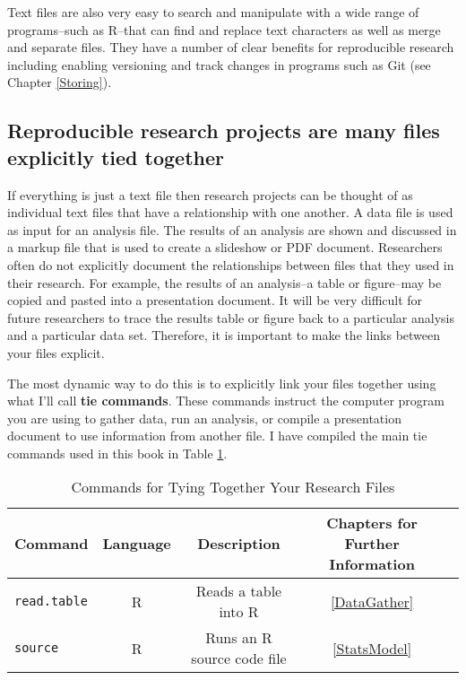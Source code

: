\documentclass[ChapterTOCs,krantz1]{krantz}\usepackage{graphicx, color}
\begin{document}
Text files are also very easy to search and manipulate with a wide range of programs--such as R--that can find and replace text characters as well as merge and separate files. They have a number of clear benefits for reproducible research including enabling versioning and track changes in programs such as Git (see Chapter \ref{Storing}).   

\subsection{Reproducible research projects are many files explicitly tied together}

If everything is just a text file then research projects can be thought of as individual text files that have a relationship with one another. A data file is used as input for an analysis file. The results of an analysis are shown and discussed in a markup file that is used to create a slideshow or PDF document. Researchers often do not explicitly document the relationships between files that they used in their research. For example, the results of an analysis--a table or figure--may be copied and pasted into a presentation document. It will be very difficult for future researchers to trace the results table or figure back to a particular analysis and a particular data set. Therefore, it is important to make the links between your files explicit. 

The most dynamic way to do this is to explicitly link your files together using what I'll call {\bf{tie commands}}.  These commands instruct the computer program you are using to gather data, run an analysis, or compile a presentation document to use information from another file. I have compiled the main tie commands used in this book in Table \ref{TableTieCommands}.

\begin{landscape}
\begin{table}
    \caption{Commands for Tying Together Your Research Files}
    \label{TableTieCommands}
    \vspace{0.3cm}
    \begin{tabular}{l c  c  c c}
        \hline
        Command & Language & Description & Chapters for Further Information \\  
        \hline \hline
        {\tt{read.table}} & R & Reads a table into R & \ref{DataGather} \\
        {\tt{source}} & R & Runs an R source code file & \ref{StatsModel} \\
        
        \hline 
        
    
    \end{tabular}
\end{table}
\end{landscape}
\end{document}
